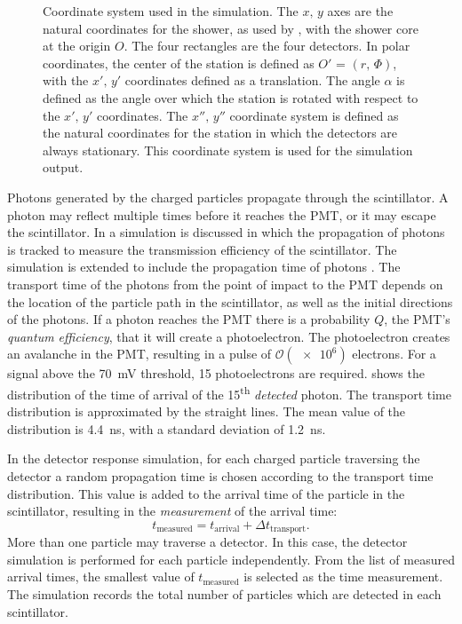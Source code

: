 \begin{figure}
\centering

\caption{Coordinate system used in the simulation.  The $x,\, y$ axes are
the natural coordinates for the shower, as used by \aires, with the shower
core at the origin $O$.  The four rectangles are the four \hisparc
detectors.  In polar coordinates, the center of the station is defined as
$O'$ = $(r,\, \Phi)$, with the $x',\, y'$ coordinates defined as a
translation.  The angle $\alpha$ is defined as the angle over which the
station is rotated with respect to the $x',\, y'$ coordinates.  The
$x'',\, y''$ coordinate system is defined as the natural coordinates for
the station in which the detectors are always stationary.  This coordinate
system is used for the simulation output.}
\label{fig:coordinates}
\end{figure}

Photons generated by the charged particles propagate through the
scintillator. A photon may reflect multiple times before it reaches the PMT, or
it may escape the scintillator. In  a simulation is
discussed in which the propagation of photons is tracked to measure the
transmission efficiency of the scintillator. The simulation is extended to
include the propagation time of photons \cite{Steijger:2010-time}. The transport
time of the photons from the point of impact to the PMT depends on the location
of the particle path in the scintillator, as well as the initial directions of
the photons. If a photon reaches the PMT there is a probability $Q$, the PMT's
\emph{quantum efficiency}, that it will create a photoelectron. The
photoelectron creates an avalanche in the PMT, resulting in a pulse of
$\mathcal{O}(\num{e6})$ electrons.
For a signal above the \SI{70}{\milli\volt} threshold, 15 photoelectrons are required.
 shows the distribution of the time of arrival
of the 15\textsuperscript{th} \emph{detected} photon. The transport time
distribution is approximated by the straight lines.
The mean value of the distribution is \SI{4.4}{\nano\second}, with a standard
deviation of \SI{1.2}{\nano\second}.

In the detector response simulation, for each charged particle traversing the
detector a random propagation time is chosen according to the transport time
distribution.
This value is added to the arrival time of the particle in the scintillator,
resulting in the \emph{measurement} of the arrival time:
\begin{equation}
t_\mathrm{measured} = t_\mathrm{arrival} + \Delta t_\mathrm{transport}.
\end{equation}
More than one particle
may traverse a detector. In this case, the detector simulation is performed for
each particle independently. From the list of measured arrival times, the
smallest value of $t_\mathrm{measured}$ is selected as the time measurement. The
simulation records the total number of particles which are detected in each
scintillator.

